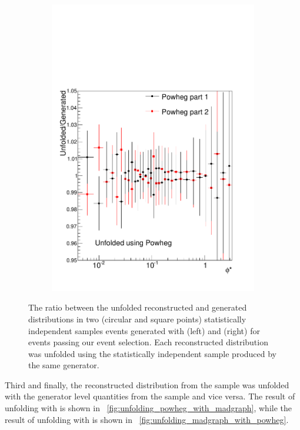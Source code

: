 \begin{figure}[!htbp]
\begin{subfigure}[b]{\SideBySidePlotWidth}
        \includegraphics[width=\textwidth]{figures/BinM_P1P2.pdf}
        \caption{}
        \label{fig:unfolding_powheg_with_powheg_halves}
    \end{subfigure}
    \caption{
        The ratio between the unfolded reconstructed and generated \phistar
        distributions in two (circular and square points) statistically
        independent samples events generated with \MADGRAPH (left) and \POWHEG
        (right) for events passing our event selection. Each reconstructed
        \phistar distribution was unfolded using the statistically independent
        sample produced by the same generator.
    }
    \label{fig:half_vs_half_unfolding}
\end{figure}

Third and finally, the reconstructed \phistar distribution from the \MADGRAPH
sample was unfolded with the generator level quantities from the \POWHEG sample
and vice versa. The result of unfolding \POWHEG with \MADGRAPH is shown in
\FIG~\ref{fig:unfolding_powheg_with_madgraph}, while the result of unfolding
\MADGRAPH with \POWHEG is shown in
\FIG~\ref{fig:unfolding_madgraph_with_powheg}.


